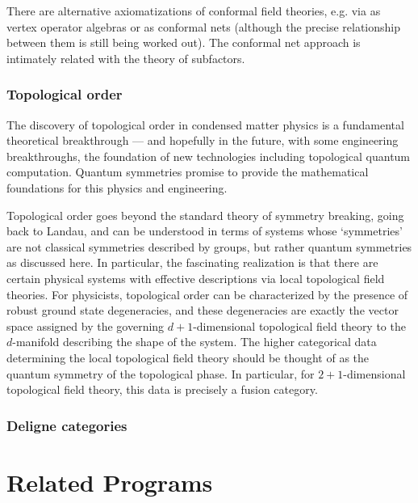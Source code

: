 \documentclass[11pt]{article}
\begin{document}
There are alternative axiomatizations of conformal field theories, e.g. via as
vertex operator algebras or as conformal nets (although the precise
relationship between them is still being worked out). The conformal net
approach is intimately related with the theory of subfactors. 


\subsubsection{Topological order}

The discovery of topological order in condensed matter physics is a
fundamental theoretical breakthrough --- and hopefully in the future, with
some engineering breakthroughs, the foundation of new technologies including
topological quantum computation. Quantum symmetries promise to provide the
mathematical foundations for this physics and engineering.

Topological order goes beyond the standard theory of symmetry breaking, going
back to Landau, and can be understood in terms of systems whose `symmetries'
are not classical symmetries described by groups, but rather quantum
symmetries as discussed here. In particular, the fascinating realization is
that there are certain physical systems with effective descriptions via local
topological field theories. For physicists, topological order can be
characterized by the presence of robust ground state degeneracies, and these
degeneracies are exactly the vector space assigned by the governing
$d+1$-dimensional topological field theory to the $d$-manifold describing the
shape of the system. The higher categorical data determining the local
topological field theory should be thought of as the quantum symmetry of the
topological phase. In particular, for $2+1$-dimensional topological field
theory, this data is precisely a fusion category.


\subsubsection{Deligne categories}

\section{Related Programs}
\end{document}
